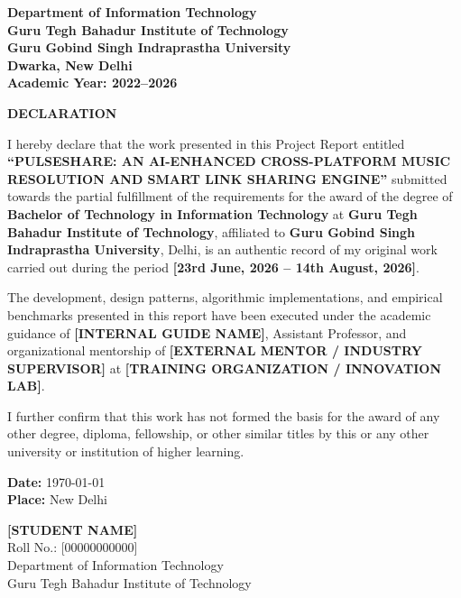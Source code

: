 \documentclass[12pt,a4paper]{report}
\newcommand{\projectTitle}{PULSESHARE: AN AI-ENHANCED CROSS-PLATFORM MUSIC RESOLUTION AND SMART LINK SHARING ENGINE}
\newcommand{\studentName}{[STUDENT NAME]}
\newcommand{\studentRoll}{[00000000000]}
\newcommand{\degreeName}{Bachelor of Technology in Information Technology}
\newcommand{\departmentName}{Department of Information Technology}
\newcommand{\instituteName}{Guru Tegh Bahadur Institute of Technology}
\newcommand{\universityName}{Guru Gobind Singh Indraprastha University}
\newcommand{\universityLocation}{Dwarka, New Delhi}
\newcommand{\academicYear}{2022--2026}
\newcommand{\internalGuide}{[INTERNAL GUIDE NAME]}
\newcommand{\guideDesignation}{Assistant Professor}
\newcommand{\companyName}{[TRAINING ORGANIZATION / INNOVATION LAB]}
\newcommand{\mentorName}{[EXTERNAL MENTOR / INDUSTRY SUPERVISOR]}
\newcommand{\trainingDuration}{[23rd June, 2026 -- 14th August, 2026]}
\begin{document}
\begin{titlepage}
\begin{center}
    \vfill
    {\large \textbf{\departmentName}}\\[0.15cm]
    {\large \textbf{\instituteName}}\\[0.15cm]
    {\textbf{\universityName}}\\[0.1cm]
    {\textbf{\universityLocation}}\\[0.2cm]
    {\textbf{Academic Year: \academicYear}}
    \vspace*{0.5cm}
\end{center}
\end{titlepage}
\thispagestyle{empty}
\clearpage

\newpage
\setcounter{page}{2}
\begin{center}
    {\fontsize{16}{20}\selectfont \textbf{DECLARATION}}
\end{center}
\vspace{1.2cm}

\noindent I hereby declare that the work presented in this Project Report entitled \textbf{``\projectTitle''} submitted towards the partial fulfillment of the requirements for the award of the degree of \textbf{\degreeName} at \textbf{\instituteName}, affiliated to \textbf{\universityName}, Delhi, is an authentic record of my original work carried out during the period \textbf{\trainingDuration}.

\vspace{0.6cm}
\noindent The development, design patterns, algorithmic implementations, and empirical benchmarks presented in this report have been executed under the academic guidance of \textbf{\internalGuide}, \guideDesignation, and organizational mentorship of \textbf{\mentorName} at \textbf{\companyName}.

\vspace{0.6cm}
\noindent I further confirm that this work has not formed the basis for the award of any other degree, diploma, fellowship, or other similar titles by this or any other university or institution of higher learning.

\vspace{3.0cm}
\begin{flushleft}
    \textbf{Date:} \today\\[0.2cm]
    \textbf{Place:} New Delhi
\end{flushleft}

\vspace{-2.2cm}
\begin{flushright}
    \textbf{\studentName}\\
    Roll No.: \studentRoll\\
    \departmentName\\
    \instituteName
\end{flushright}
\clearpage
\end{document}
